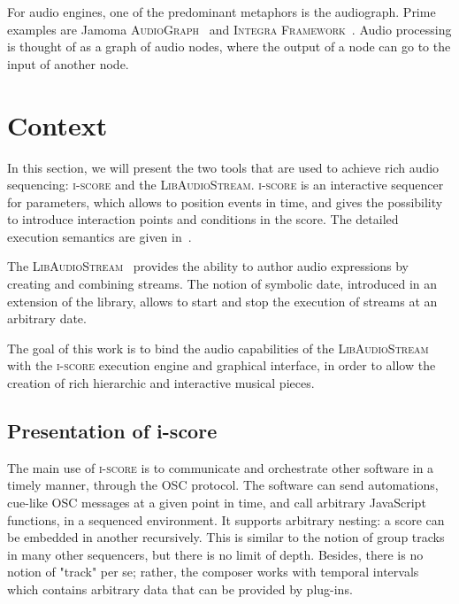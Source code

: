 \documentclass{article}
\newcommand*{\LibAudioStream}{\textsc{LibAudioStream}\xspace}
\newcommand*{\iscore}{\textsc{i-score}\xspace}
\newcommand*{\jamomaaudiograph}{Jamoma \textsc{AudioGraph}\xspace}
\newcommand*{\integraframework}{\textsc{Integra Framework}\xspace}
\begin{document}
For audio engines, one of the predominant metaphors is the audiograph.
Prime examples are \jamomaaudiograph~\cite{place2010jamoma} and \integraframework~\cite{bullock2011integra}.
Audio processing is thought of as a graph of audio nodes, where the output of a node can go to the input of another node.

\section{Context}
In this section, we will present the two tools that are used to achieve 
rich audio sequencing: \iscore and the \LibAudioStream.
\iscore is an interactive sequencer for parameters, which allows to position events 
in time, and gives the possibility to introduce interaction points and 
conditions in the score.
The detailed execution semantics are given in~\cite{celerier2015ossia}.

The \LibAudioStream~\cite{letzlibaudiostream} provides the ability to author audio expressions
by creating and combining streams. The notion of symbolic date, introduced in an extension of the library,
allows to start and stop the execution of streams at an arbitrary date.

The goal of this work is to bind the audio capabilities of the \LibAudioStream 
with the \iscore execution engine and graphical interface, in order to allow 
the creation of rich hierarchic and interactive musical pieces.

\subsection{Presentation of i-score}
The main use of \iscore is to communicate and orchestrate other software in a timely manner, 
through the OSC protocol.
The software can send automations, cue-like OSC messages at a given point in time, and call arbitrary JavaScript functions, in a sequenced environment.
It supports arbitrary nesting: a score can be embedded in another recursively.
This is similar to the notion of group tracks in many other sequencers, but 
there is no limit of depth. 
Besides, there is no notion of "track" per se; rather, the composer works with 
temporal intervals which contains arbitrary data that can be provided by plug-ins.
\end{document}
